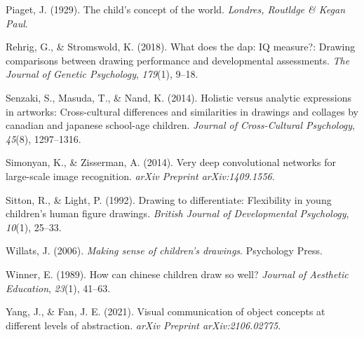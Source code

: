 \documentclass[
  english,
  man]{apa6}
\begin{document}
\leavevmode\hypertarget{ref-piaget1929child}{}%
Piaget, J. (1929). The child's concept of the world. \emph{Londres, Routldge \& Kegan Paul}.

\leavevmode\hypertarget{ref-rehrig2018does}{}%
Rehrig, G., \& Stromswold, K. (2018). What does the dap: IQ measure?: Drawing comparisons between drawing performance and developmental assessments. \emph{The Journal of Genetic Psychology}, \emph{179}(1), 9--18.

\leavevmode\hypertarget{ref-senzaki2014holistic}{}%
Senzaki, S., Masuda, T., \& Nand, K. (2014). Holistic versus analytic expressions in artworks: Cross-cultural differences and similarities in drawings and collages by canadian and japanese school-age children. \emph{Journal of Cross-Cultural Psychology}, \emph{45}(8), 1297--1316.

\leavevmode\hypertarget{ref-simonyan2014very}{}%
Simonyan, K., \& Zisserman, A. (2014). Very deep convolutional networks for large-scale image recognition. \emph{arXiv Preprint arXiv:1409.1556}.

\leavevmode\hypertarget{ref-sitton1992drawing}{}%
Sitton, R., \& Light, P. (1992). Drawing to differentiate: Flexibility in young children's human figure drawings. \emph{British Journal of Developmental Psychology}, \emph{10}(1), 25--33.

\leavevmode\hypertarget{ref-willats2006making}{}%
Willats, J. (2006). \emph{Making sense of children's drawings}. Psychology Press.

\leavevmode\hypertarget{ref-winner1989can}{}%
Winner, E. (1989). How can chinese children draw so well? \emph{Journal of Aesthetic Education}, \emph{23}(1), 41--63.

\leavevmode\hypertarget{ref-yang2021visual}{}%
Yang, J., \& Fan, J. E. (2021). Visual communication of object concepts at different levels of abstraction. \emph{arXiv Preprint arXiv:2106.02775}.
\end{document}
